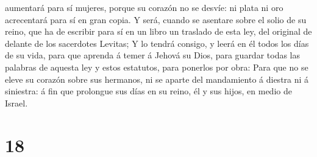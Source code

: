aumentará para sí mujeres, porque su corazón no se desvíe: ni plata ni
oro acrecentará para sí en gran copia.  Y será, cuando se
asentare sobre el solio de su reino, que ha de escribir para sí en un
libro un traslado de esta ley, del original de delante de los sacerdotes
Levitas;  Y lo tendrá consigo, y leerá en él todos los días
de su vida, para que aprenda á temer á Jehová su Dios, para guardar
todas las palabras de aquesta ley y estos estatutos, para ponerlos por
obra:  Para que no se eleve su corazón sobre sus hermanos,
ni se aparte del mandamiento á diestra ni á siniestra: á fin que
prolongue sus días en su reino, él y sus hijos, en medio de Israel.

\hypertarget{section-17}{%
\section{18}\label{section-17}}

